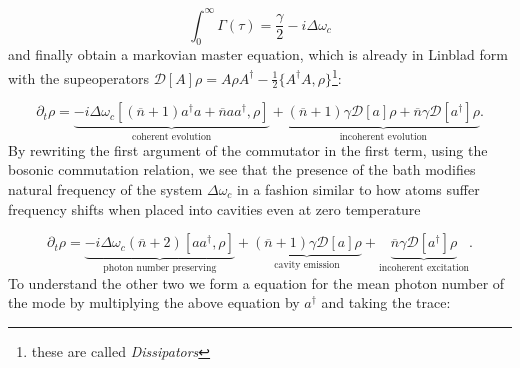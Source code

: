 \begin{equation}
  \int_{0}^{\infty}\Gamma(\tau)=\frac{\gamma}{2} -i \Delta \omega_{c}
\end{equation}
and finally obtain a markovian master equation, which is already in Linblad form with the supeoperators $\mathcal{D}[A]\rho=A\rho A^{\dagger}-\frac{1}{2}\{A^{\dagger}A,\rho\}$\footnote{these are called \textit{Dissipators}}:

\begin{equation}
  \partial_{t}\rho = \underbrace{-i\Delta\omega_{c}[(\overline{n}+1)a^{\dagger}a + \overline{n}aa^{\dagger}, \rho]}_{\text{coherent evolution}} + \underbrace{(\overline{n}+1)\gamma\mathcal{D}[a]\rho +
\overline{n}\gamma\mathcal{D}[a^{\dagger}]\rho}_{\text{incoherent evolution}}.
\end{equation}
By rewriting the first argument of the commutator  in the first term, using the bosonic commutation relation, we see that the presence of the bath modifies natural frequency of the system $\Delta\omega_{c}$ in a fashion similar to how atoms suffer frequency shifts when placed into cavities even at zero temperature \cite{dutra2005cavity}

\begin{equation}
\partial_{t}\rho = \underbrace{-i\Delta\omega_{c}(\overline{n}+2)[aa^{\dagger}, \rho]}_{\text{photon number preserving}} + \underbrace{(\overline{n}+1)\gamma\mathcal{D}[a]\rho}_{\text{cavity emission}} +\underbrace{\overline{n}\gamma\mathcal{D}[a^{\dagger}]\rho}_{\text{incoherent excitation}}.
\end{equation}
To understand the other two we form a equation for the mean photon number of the mode by multiplying the above equation by $a^{\dagger}$ and
taking the trace:

